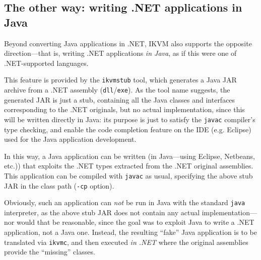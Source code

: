 \subsection{The other way: writing .NET applications in Java}
\label{ssec:ikvm-writing-app-in-java}

Beyond converting Java applications in .NET, IKVM also supports the opposite direction---that is, writing .NET applications \textit{in Java}, as if this were one of .NET-supported languages.

This feature is provided by the \texttt{ikvmstub} tool, which generates a Java JAR archive from a .NET assembly (\texttt{dll}/\texttt{exe}).
As the tool name suggests, the generated JAR is just a stub, containing all the Java classes and interfaces corresponding to the .NET originals, but no actual implementation, since this will be written directly in Java: its purpose is just to satisfy the \texttt{javac} compiler's type checking, and enable the code completion feature on the IDE (e.g. Eclipse) used for the Java application development.

In this way, a Java application can be written (in Java---using Eclipse, Netbeans, etc.)) that exploits the .NET types extracted from the .NET original assemblies.
This application can be compiled with \texttt{javac} as usual, specifying the above stub JAR in the class path (\texttt{-cp} option).

Obviously, such an application can \textit{not} be run in Java with the standard \texttt{java} interpreter, as the above stub JAR does not contain any actual implementation---nor would that be reasonable, since the goal was to exploit Java to write a .NET application, not a Java one.
%
Instead, the resulting ``fake'' Java application is to be translated via \texttt{ikvmc}, and then executed \textit{in .NET} where the original assemblies provide the ``missing'' classes.

\medskip

